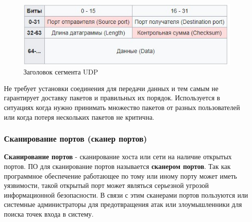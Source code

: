\begin{figure}
\centering
\includegraphics{./files/udp_header_scheme.jpg}
\caption{Заголовок сегмента UDP}
\end{figure}

Не требует установки соединения для передачи данных и тем самым не
гарантирует доставку пакетов и правильных их порядок. Используется в
ситуациях когда нужно принимать множество пакетов от разных
пользователей или когда потеря нескольких пакетов не критична.

\hypertarget{ux441ux43aux430ux43dux438ux440ux43eux432ux430ux43dux438ux435-ux43fux43eux440ux442ux43eux432-ux441ux43aux430ux43dux435ux440-ux43fux43eux440ux442ux43eux432}{%
\subsubsection{Сканирование портов (сканер
портов)}\label{ux441ux43aux430ux43dux438ux440ux43eux432ux430ux43dux438ux435-ux43fux43eux440ux442ux43eux432-ux441ux43aux430ux43dux435ux440-ux43fux43eux440ux442ux43eux432}}

\textbf{Сканирование портов} - сканирование хоста или сети на наличие
открытых портов. ПО для сканирование портов называется \textbf{сканером
портов}. Так как программное обеспечение работающее по тому или иному
порту может иметь уязвимости, такой открытый порт может являться
серьезной угрозой информационной безопасности. В связи с этим сканерами
портов пользуются или системные администраторы для предотвращения атак
или злоумышленники для поиска точек входа в систему.
